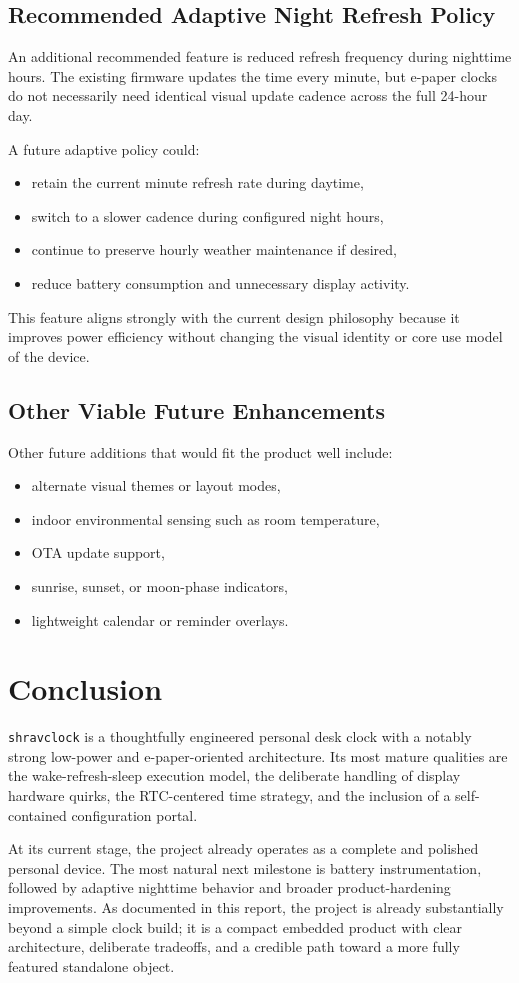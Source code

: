 \documentclass[11pt]{article}
\begin{document}
\subsection{Recommended Adaptive Night Refresh Policy}
An additional recommended feature is reduced refresh frequency during nighttime hours. The existing firmware updates the time every minute, but e-paper clocks do not necessarily need identical visual update cadence across the full 24-hour day.

A future adaptive policy could:
\begin{itemize}
  \item retain the current minute refresh rate during daytime,
  \item switch to a slower cadence during configured night hours,
  \item continue to preserve hourly weather maintenance if desired,
  \item reduce battery consumption and unnecessary display activity.
\end{itemize}

This feature aligns strongly with the current design philosophy because it improves power efficiency without changing the visual identity or core use model of the device.

\subsection{Other Viable Future Enhancements}
Other future additions that would fit the product well include:
\begin{itemize}
  \item alternate visual themes or layout modes,
  \item indoor environmental sensing such as room temperature,
  \item OTA update support,
  \item sunrise, sunset, or moon-phase indicators,
  \item lightweight calendar or reminder overlays.
\end{itemize}

\section{Conclusion}
\texttt{shravclock} is a thoughtfully engineered personal desk clock with a notably strong low-power and e-paper-oriented architecture. Its most mature qualities are the wake-refresh-sleep execution model, the deliberate handling of display hardware quirks, the RTC-centered time strategy, and the inclusion of a self-contained configuration portal.

At its current stage, the project already operates as a complete and polished personal device. The most natural next milestone is battery instrumentation, followed by adaptive nighttime behavior and broader product-hardening improvements. As documented in this report, the project is already substantially beyond a simple clock build; it is a compact embedded product with clear architecture, deliberate tradeoffs, and a credible path toward a more fully featured standalone object.
\end{document}
